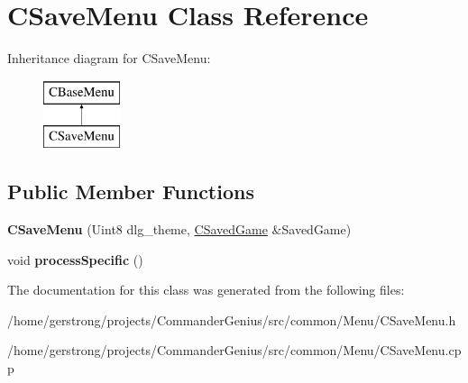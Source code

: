 \hypertarget{class_c_save_menu}{
\section{CSaveMenu Class Reference}
\label{class_c_save_menu}
}
Inheritance diagram for CSaveMenu:\begin{figure}[H]
\begin{center}
\leavevmode
\includegraphics[height=2cm]{class_c_save_menu}
\end{center}
\end{figure}
\subsection*{Public Member Functions}
\begin{DoxyCompactItemize}
\item 
\hypertarget{class_c_save_menu_ac689b70a8b5375f594d483c7b855a2f8}{
{\bfseries CSaveMenu} (Uint8 dlg\_\-theme, \hyperlink{class_c_saved_game}{CSavedGame} \&SavedGame)}
\label{class_c_save_menu_ac689b70a8b5375f594d483c7b855a2f8}

\item 
\hypertarget{class_c_save_menu_a307755e85e5e879e167b907718bb3d98}{
void {\bfseries processSpecific} ()}
\label{class_c_save_menu_a307755e85e5e879e167b907718bb3d98}

\end{DoxyCompactItemize}


The documentation for this class was generated from the following files:\begin{DoxyCompactItemize}
\item 
/home/gerstrong/projects/CommanderGenius/src/common/Menu/CSaveMenu.h\item 
/home/gerstrong/projects/CommanderGenius/src/common/Menu/CSaveMenu.cpp\end{DoxyCompactItemize}
